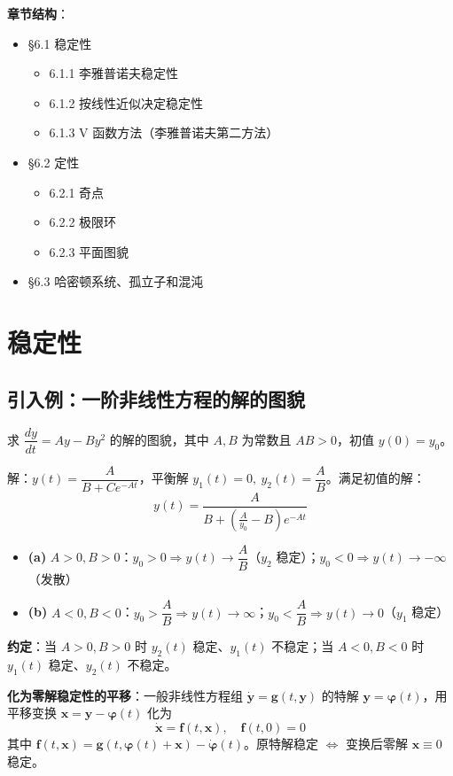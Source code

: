 \textbf{章节结构}：
\begin{itemize}
    \item \S 6.1 稳定性
    \begin{itemize}
        \item 6.1.1 李雅普诺夫稳定性
        \item 6.1.2 按线性近似决定稳定性
        \item 6.1.3 V 函数方法（李雅普诺夫第二方法）
    \end{itemize}
    \item \S 6.2 定性
    \begin{itemize}
        \item 6.2.1 奇点
        \item 6.2.2 极限环
        \item 6.2.3 平面图貌
    \end{itemize}
    \item \S 6.3 哈密顿系统、孤立子和混沌
\end{itemize}

\section{稳定性}

\subsection{引入例：一阶非线性方程的解的图貌}

求 $\dfrac{dy}{dt} = Ay - By^2$ 的解的图貌，其中 $A, B$ 为常数且 $AB > 0$，初值 $y(0) = y_0$。

解：$y(t) = \dfrac{A}{B + Ce^{-At}}$，平衡解 $y_1(t) = 0, \ y_2(t) = \dfrac{A}{B}$。满足初值的解：
$$y(t) = \frac{A}{B + \left(\frac{A}{y_0} - B\right)e^{-At}}$$

\begin{itemize}
    \item \textbf{(a)} $A > 0, B > 0$：$y_0 > 0 \Rightarrow y(t) \to \dfrac{A}{B}$（$y_2$ 稳定）；$y_0 < 0 \Rightarrow y(t) \to -\infty$（发散）
    \item \textbf{(b)} $A < 0, B < 0$：$y_0 > \dfrac{A}{B} \Rightarrow y(t) \to \infty$；$y_0 < \dfrac{A}{B} \Rightarrow y(t) \to 0$（$y_1$ 稳定）
\end{itemize}

\textbf{约定}：当 $A > 0, B > 0$ 时 $y_2(t)$ 稳定、$y_1(t)$ 不稳定；当 $A < 0, B < 0$ 时 $y_1(t)$ 稳定、$y_2(t)$ 不稳定。

\textbf{化为零解稳定性的平移}：一般非线性方程组 $\dot{\mathbf{y}} = \mathbf{g}(t, \mathbf{y})$ 的特解 $\mathbf{y} = \boldsymbol{\varphi}(t)$，用平移变换 $\mathbf{x} = \mathbf{y} - \boldsymbol{\varphi}(t)$ 化为
$$\dot{\mathbf{x}} = \mathbf{f}(t, \mathbf{x}), \quad \mathbf{f}(t, 0) = 0$$
其中 $\mathbf{f}(t, \mathbf{x}) = \mathbf{g}(t, \boldsymbol{\varphi}(t) + \mathbf{x}) - \dot{\boldsymbol{\varphi}}(t)$。原特解稳定 $\iff$ 变换后零解 $\mathbf{x} \equiv 0$ 稳定。

